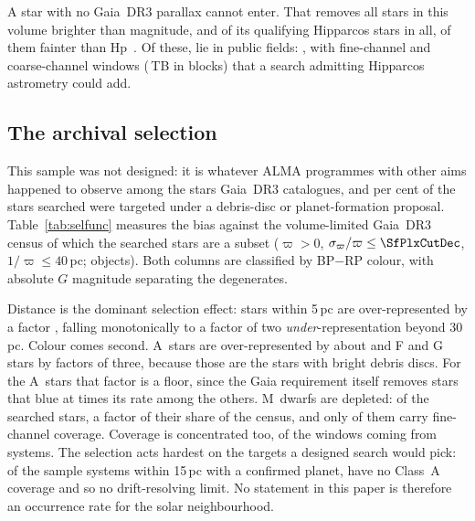 A star with no Gaia~DR3 parallax cannot enter. That removes all \BsNBright{}
stars in this volume brighter than \BsBrightMag{} magnitude, and \BsNGap{} of
its \BsNVol{} qualifying Hipparcos stars in all, \BsGapNFaint{} of them
fainter than Hp~\BsGapMagCut. Of these, \BsNAlmaWord{} lie in public fields:
\BsStarList, with \BsNWinA{} fine-channel and \BsNWinB{} coarse-channel windows
(\BsRawTB\,TB in \BsNEB{} blocks) that a search admitting Hipparcos astrometry
could add.


\subsection{The archival selection}
\label{sec:bias}

This sample was not designed: it is whatever ALMA programmes with other aims
happened to observe among the stars Gaia~DR3 catalogues, and \PctDiscProposal{} per cent
of the stars searched were targeted under a debris-disc or planet-formation
proposal. Table~\ref{tab:selfunc} measures the bias against the volume-limited
Gaia~DR3 census of which the searched stars are a subset ($\varpi>0$,
$\sigma_\varpi/\varpi\le\SfPlxCutDec$, $1/\varpi\le40$\,pc; \SfCensusN{}
objects). Both columns are classified by BP$-$RP colour, with absolute $G$
magnitude separating the degenerates.

Distance is the dominant selection effect: stars within 5\,pc are
over-represented by a factor \SfTopRatio, falling monotonically to a factor of
two \emph{under}-representation beyond 30\,pc. Colour comes second. A~stars are
over-represented by about \SfARatio{} and F and G stars by factors of three,
because those are the stars with bright debris discs. For the A~stars that
factor is a floor, since the Gaia requirement itself removes stars that blue
at \BsEarlyRatio{} times its rate among the others. M~dwarfs are depleted:
\SfMSearched{} of the \SfNStar{} searched stars, a factor \SfMRatio{} of their
share of the census, and only \SfMClassAStars{} of them carry fine-channel
coverage. Coverage is concentrated too, \ConcThreeWin{} of the \NWindows{}
windows coming from \ConcThreeSys{} systems. The selection acts hardest on the
targets a designed search would pick: of the \CsIntNRow{} sample systems within
15\,pc with a confirmed planet, \CsIntNoClassA{} have no Class~A coverage and so
no drift-resolving limit. No statement in this paper is therefore an
occurrence rate for the solar neighbourhood.



